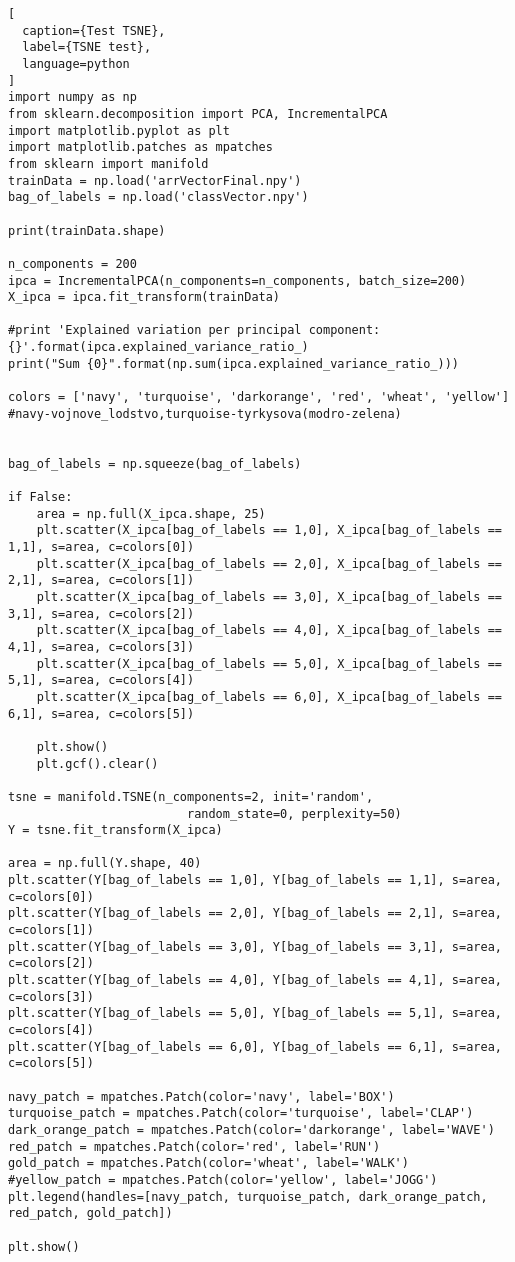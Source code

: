 \begin{lstlisting}[
  caption={Test TSNE},
  label={TSNE test},
  language=python
]
import numpy as np
from sklearn.decomposition import PCA, IncrementalPCA
import matplotlib.pyplot as plt
import matplotlib.patches as mpatches
from sklearn import manifold 
trainData = np.load('arrVectorFinal.npy')
bag_of_labels = np.load('classVector.npy')
 
print(trainData.shape)
 
n_components = 200
ipca = IncrementalPCA(n_components=n_components, batch_size=200)
X_ipca = ipca.fit_transform(trainData)
 
#print 'Explained variation per principal component: {}'.format(ipca.explained_variance_ratio_)
print("Sum {0}".format(np.sum(ipca.explained_variance_ratio_)))
 
colors = ['navy', 'turquoise', 'darkorange', 'red', 'wheat', 'yellow'] #navy-vojnove_lodstvo,turquoise-tyrkysova(modro-zelena)
 
 
bag_of_labels = np.squeeze(bag_of_labels)
 
if False:
    area = np.full(X_ipca.shape, 25)
    plt.scatter(X_ipca[bag_of_labels == 1,0], X_ipca[bag_of_labels == 1,1], s=area, c=colors[0])
    plt.scatter(X_ipca[bag_of_labels == 2,0], X_ipca[bag_of_labels == 2,1], s=area, c=colors[1])
    plt.scatter(X_ipca[bag_of_labels == 3,0], X_ipca[bag_of_labels == 3,1], s=area, c=colors[2])
    plt.scatter(X_ipca[bag_of_labels == 4,0], X_ipca[bag_of_labels == 4,1], s=area, c=colors[3])
    plt.scatter(X_ipca[bag_of_labels == 5,0], X_ipca[bag_of_labels == 5,1], s=area, c=colors[4])
    plt.scatter(X_ipca[bag_of_labels == 6,0], X_ipca[bag_of_labels == 6,1], s=area, c=colors[5])
 
    plt.show()
    plt.gcf().clear()
 
tsne = manifold.TSNE(n_components=2, init='random',
                         random_state=0, perplexity=50)
Y = tsne.fit_transform(X_ipca)
 
area = np.full(Y.shape, 40)
plt.scatter(Y[bag_of_labels == 1,0], Y[bag_of_labels == 1,1], s=area, c=colors[0])
plt.scatter(Y[bag_of_labels == 2,0], Y[bag_of_labels == 2,1], s=area, c=colors[1])
plt.scatter(Y[bag_of_labels == 3,0], Y[bag_of_labels == 3,1], s=area, c=colors[2])
plt.scatter(Y[bag_of_labels == 4,0], Y[bag_of_labels == 4,1], s=area, c=colors[3])
plt.scatter(Y[bag_of_labels == 5,0], Y[bag_of_labels == 5,1], s=area, c=colors[4])
plt.scatter(Y[bag_of_labels == 6,0], Y[bag_of_labels == 6,1], s=area, c=colors[5])
 
navy_patch = mpatches.Patch(color='navy', label='BOX')
turquoise_patch = mpatches.Patch(color='turquoise', label='CLAP')
dark_orange_patch = mpatches.Patch(color='darkorange', label='WAVE')
red_patch = mpatches.Patch(color='red', label='RUN')
gold_patch = mpatches.Patch(color='wheat', label='WALK')
#yellow_patch = mpatches.Patch(color='yellow', label='JOGG')
plt.legend(handles=[navy_patch, turquoise_patch, dark_orange_patch, red_patch, gold_patch])
 
plt.show()
\end{lstlisting}


